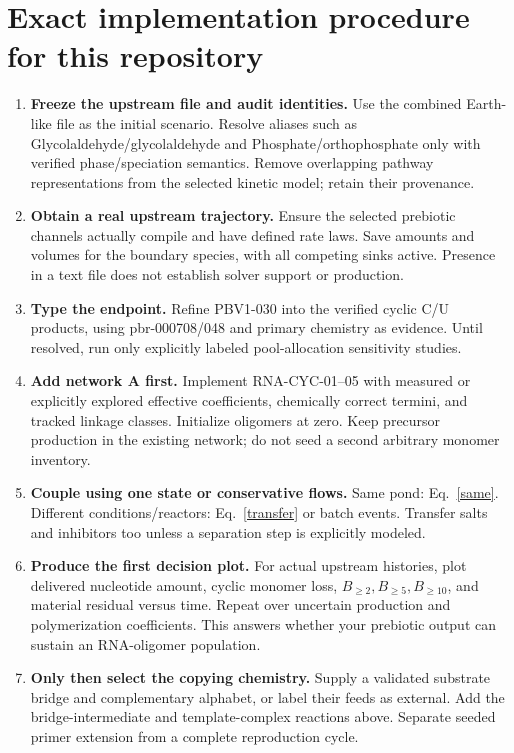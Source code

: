 \documentclass[11pt]{article}
\begin{document}
\section{Exact implementation procedure for this repository}
\begin{enumerate}
\item \textbf{Freeze the upstream file and audit identities.} Use the combined
Earth-like file as the initial scenario. Resolve aliases such as
Glycolaldehyde/glycolaldehyde and Phosphate/orthophosphate only with verified
phase/speciation semantics. Remove overlapping pathway representations from
the selected kinetic model; retain their provenance.
\item \textbf{Obtain a real upstream trajectory.} Ensure the selected prebiotic
channels actually compile and have defined rate laws. Save amounts and volumes
for the boundary species, with all competing sinks active. Presence in a text
file does not establish solver support or production.
\item \textbf{Type the endpoint.} Refine PBV1-030 into the verified cyclic C/U
products, using pbr-000708/048 and primary chemistry as evidence. Until resolved,
run only explicitly labeled pool-allocation sensitivity studies.
\item \textbf{Add network A first.} Implement RNA-CYC-01--05 with measured or
explicitly explored effective coefficients, chemically correct termini, and
tracked linkage classes. Initialize oligomers at zero. Keep precursor production
in the existing network; do not seed a second arbitrary monomer inventory.
\item \textbf{Couple using one state or conservative flows.} Same pond:
Eq.~\eqref{same}. Different conditions/reactors: Eq.~\eqref{transfer} or batch events.
Transfer salts and inhibitors too unless a separation step is explicitly modeled.
\item \textbf{Produce the first decision plot.} For actual upstream histories,
plot delivered nucleotide amount, cyclic monomer loss, $B_{\ge2},B_{\ge5},B_{\ge10}$,
and material residual versus time. Repeat over uncertain production and
polymerization coefficients. This answers whether your prebiotic output can
sustain an RNA-oligomer population.
\item \textbf{Only then select the copying chemistry.} Supply a validated
substrate bridge and complementary alphabet, or label their feeds as external.
Add the bridge-intermediate and template-complex reactions above. Separate
seeded primer extension from a complete reproduction cycle.
\end{enumerate}
\end{document}
